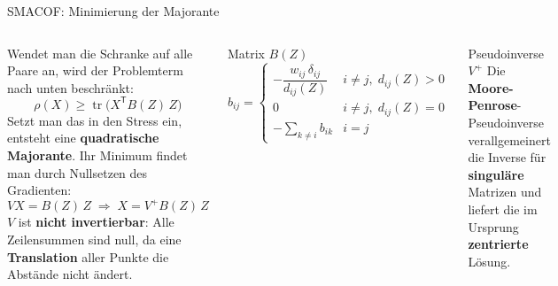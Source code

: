 \begin{frame}{SMACOF: Minimierung der Majorante}
\footnotesize
\begin{columns}
Wendet man die Schranke auf alle Paare an, wird der Problemterm nach unten
beschränkt:
\[
  \rho(X) \geq \operatorname{tr}\bigl(X^{\mathsf{T}} B(Z)\,Z\bigr)
\]
Setzt man das in den Stress ein, entsteht eine \textbf{quadratische
Majorante}. Ihr Minimum findet man durch Nullsetzen des Gradienten:
\[
  V X = B(Z)\,Z \;\Rightarrow\; X = V^{+} B(Z)\,Z
\]
$V$ ist \textbf{nicht invertierbar}: Alle Zeilensummen sind null, da eine
\textbf{Translation} aller Punkte die Abstände nicht ändert.

\begin{block}{\footnotesize Matrix $B(Z)$}
\[
  b_{ij} =
  \begin{cases}
    -\dfrac{w_{ij}\,\delta_{ij}}{d_{ij}(Z)} & i \neq j,\; d_{ij}(Z) > 0\\[6pt]
    0 & i \neq j,\; d_{ij}(Z) = 0\\[4pt]
    -\sum_{k \neq i} b_{ik} & i = j
  \end{cases}
\]
\end{block}

\begin{blockDef}{\footnotesize Pseudoinverse $V^{+}$}
Die \textbf{Moore-Penrose}-Pseudoinverse verallgemeinert die Inverse für
\textbf{singuläre} Matrizen und liefert die im Ursprung \textbf{zentrierte}
Lösung.
\end{blockDef}
\end{columns}

\end{frame}
